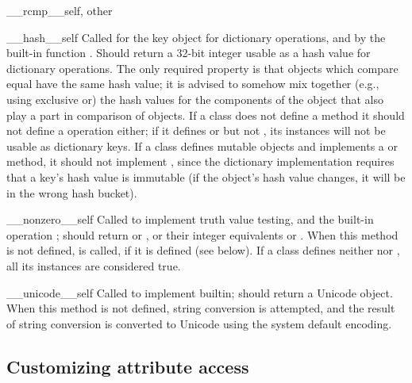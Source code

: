 \begin{methoddesc}[object]{__rcmp__}{self, other}
\end{methoddesc}

\begin{methoddesc}[object]{__hash__}{self}
Called for the key object for dictionary 
operations, and by the built-in function
.  Should return a 32-bit integer
usable as a hash value
for dictionary operations.  The only required property is that objects
which compare equal have the same hash value; it is advised to somehow
mix together (e.g., using exclusive or) the hash values for the
components of the object that also play a part in comparison of
objects.  If a class does not define a  method it should
not define a  operation either; if it defines
 or  but not ,
its instances will not be usable as dictionary keys.  If a class
defines mutable objects and implements a  or
 method, it should not implement ,
since the dictionary implementation requires that a key's hash value
is immutable (if the object's hash value changes, it will be in the
wrong hash bucket).
\end{methoddesc}

\begin{methoddesc}[object]{__nonzero__}{self}
Called to implement truth value testing, and the built-in operation
; should return  or , or their
integer equivalents  or .
When this method is not defined,  is
called, if it is defined (see below).  If a class defines neither
 nor , all its instances are
considered true.
\end{methoddesc}

\begin{methoddesc}[object]{__unicode__}{self}
Called to implement  builtin;
should return a Unicode object. When this method is not defined, string
conversion is attempted, and the result of string conversion is converted
to Unicode using the system default encoding.
\end{methoddesc}


\subsection{Customizing attribute access\label{attribute-access}}

